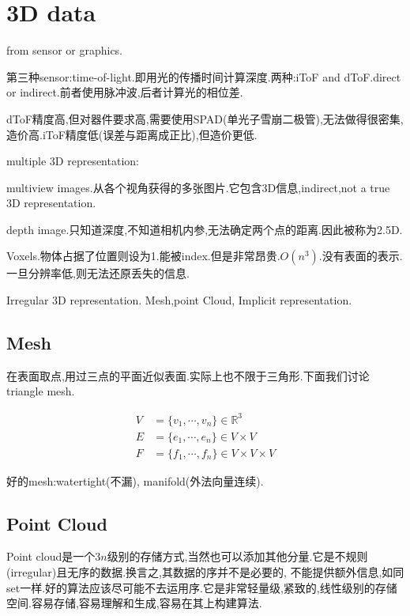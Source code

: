 \section{3D data}

from sensor or graphics.

第三种sensor:time-of-light.即用光的传播时间计算深度.两种:iToF and dToF.direct or indirect.前者使用脉冲波,后者计算光的相位差.

dToF精度高,但对器件要求高,需要使用SPAD(单光子雪崩二极管),无法做得很密集,造价高.iToF精度低(误差与距离成正比),但造价更低.

multiple 3D representation:

multiview images.从各个视角获得的多张图片.它包含3D信息,indirect,not a true 3D representation.

depth image.只知道深度,不知道相机内参,无法确定两个点的距离.因此被称为2.5D.

Voxels.物体占据了位置则设为1.能被index.但是非常昂贵.$O(n^3)$.没有表面的表示.一旦分辨率低,则无法还原丢失的信息.

Irregular 3D representation. Mesh,point Cloud, Implicit representation.

\subsection{Mesh}

在表面取点,用过三点的平面近似表面.实际上也不限于三角形.下面我们讨论triangle mesh.

\begin{equation}
    \begin{aligned}
        V &= \{v_1, \cdots, v_n\} \in \mathbb R^3
        \\
        E &= \{e_1, \cdots, e_n\} \in V\times V
        \\
        F &= \{f_1, \cdots, f_n\} \in V\times V \times V
    \end{aligned}
\end{equation}


好的mesh:watertight(不漏), manifold(外法向量连续).

\subsection{Point Cloud}

Point cloud是一个$3n$级别的存储方式,当然也可以添加其他分量.它是不规则(irregular)且无序的数据.换言之,其数据的序并不是必要的,
不能提供额外信息,如同set一样.好的算法应该尽可能不去运用序.它是非常轻量级,紧致的,线性级别的存储空间.容易存储,容易理解和生成,容易在其上构建算法.

